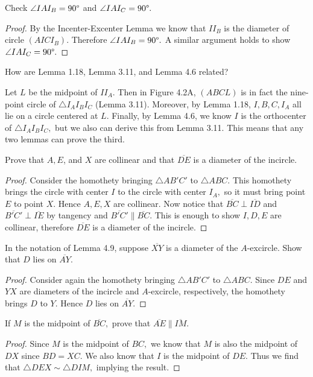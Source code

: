 \documentclass[letterpaper,oneside]{scrartcl}
\providecommand{\ol}{\overline}
\begin{document}
\begin{problem*}
  [4.5]
  Check $\angle IAI_B = 90\degree$ and $\angle IAI_C = 90\degree.$
\end{problem*}
\begin{proof}
  By the Incenter-Excenter Lemma we know that $II_B$ is the diameter of circle $(AICI_B)$. Therefore $\angle IAI_B = 90\degree.$ A similar argument holds to show $\angle IAI_C = 90\degree.$
\end{proof}

\begin{problem*}
  [4.7]
  How are Lemma 1.18, Lemma 3.11, and Lemma 4.6 related?
\end{problem*}
Let $L$ be the midpoint of $II_A.$ Then in Figure 4.2A, $(ABCL)$ is in fact the nine-point circle of $\triangle I_AI_BI_C$ (Lemma 3.11). Moreover, by Lemma 1.18, $I,B,C,I_A$ all lie on a circle centered at $L.$ Finally, by Lemma 4.6, we know $I$ is the orthocenter of $\triangle I_AI_BI_C,$ but we also can derive this from Lemma 3.11. This means that any two lemmas can prove the third.

\begin{problem*}
  [4.8]
  Prove that $A, E$, and $X$ are collinear and that $\ol{DE}$ is a diameter of the incircle.
\end{problem*}
\begin{proof}
  Consider the homothety bringing $\triangle AB'C'$ to $\triangle ABC.$ This homothety brings the circle with center $I$ to the circle with center $I_A,$ so it must bring point $E$ to point $X.$ Hence $A,E,X$ are collinear. Now notice that $\ol{BC} \perp \ol{ID}$ and $\ol{B'C'} \perp \ol{IE}$ by tangency and $\ol{B'C'} \parallel \ol{BC}.$ This is enough to show $I,D,E$ are collinear, therefore $\ol{DE}$ is a diameter of the incircle.
\end{proof}

\begin{lemma*}
  In the notation of Lemma 4.9, suppose $\ol{XY}$ is a diameter of the $A$-excircle. Show that $D$ lies on $\ol{AY}.$
\end{lemma*}
\begin{proof}
  Consider again the homothety bringing $\triangle AB'C'$ to $\triangle ABC.$ Since $DE$ and $YX$ are diameters of the incircle and $A$-excircle, respectively, the homothety brings $D$ to $Y.$ Hence $D$ lies on $\ol{AY}.$
\end{proof}

\begin{problem*}
  [4.11]
  If $M$ is the midpoint of $\ol{BC},$ prove that $\ol{AE} \parallel \ol{IM}.$
\end{problem*}
\begin{proof}
  Since $M$ is the midpoint of $BC,$ we know that $M$ is also the midpoint of $DX$ since $BD=XC.$ We also know that $I$ is the midpoint of $DE.$ Thus we find that $\triangle DEX \sim \triangle DIM,$ implying the result.
\end{proof}
\end{document}
